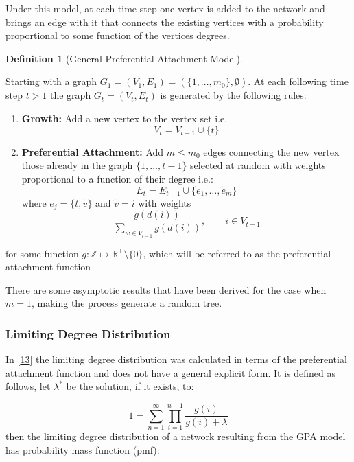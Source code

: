 \documentclass[
  10pt,
  a4paper,
]{scrreprt}
\providecommand{\tightlist}{%
  \setlength{\itemsep}{0pt}\setlength{\parskip}{0pt}}\usepackage{longtable,booktabs,array}
\theoremstyle{definition}
\newtheorem{definition}{Definition}[section]
\theoremstyle{plain}
\theoremstyle{plain}
\theoremstyle{remark}
\begin{document}
{Under this model, at each time step one vertex is added to the network
and brings an edge with it that connects the existing vertices with a
probability proportional to some function of the vertices degrees.

\begin{definition}[General Preferential Attachment
Model]\protect\hypertarget{def-gpa}{}\label{def-gpa}

Starting with a graph
\(G_1 = (V_1, E_1) = (\{1,\ldots,m_0\}, \emptyset)\). At each following
time step \(t>1\) the graph \(G_t = (V_t, E_t)\) is generated by the
following rules:

\begin{enumerate}
\def\labelenumi{\arabic{enumi}.}
\tightlist
\item
  \textbf{Growth:} Add a new vertex to the vertex set i.e.~\[
  V_t = V_{t-1} \cup \{t\}
  \]
\item
  \textbf{Preferential Attachment:} Add \(m\le m_0\) edges connecting
  the new vertex those already in the graph \(\{1,\ldots,t-1\}\)
  selected at random with weights proportional to a function of their
  degree i.e.: \[
  E_t  = E_{t-1} \cup \{\tilde e_1,\ldots,\tilde e_m\}
  \] where \(\tilde e_j = \{t,\tilde v\}\) and \(\tilde v = i\) with
  weights \[
  \displaystyle\frac{g(d(i))}{\sum_{w\in V_{t-1}} g(d(i))}, \qquad i\in V_{t-1}
  \]
\end{enumerate}

for some function \(g: \mathbb Z \mapsto \mathbb R^+\setminus\{0\}\),
which will be referred to as the preferential attachment function

\end{definition}

There are some asymptotic results that have been derived for the case
when \(m=1\), making the process generate a random tree.

\hypertarget{limiting-degree-distribution}{%
\subsubsection{Limiting Degree
Distribution}\label{limiting-degree-distribution}}

In {[}\protect\hyperlink{ref-rudas07}{13}{]} the limiting degree
distribution was calculated in terms of the preferential attachment
function and does not have a general explicit form. It is defined as
follows, let \(\lambda^*\) be the solution, if it exists, to:

\[
1=\sum_{n=1}^\infty \prod_{i=1}^{n-1}\displaystyle\frac{g(i)}{g(i)+\lambda}
\] then the limiting degree distribution of a network resulting from the
GPA model has probability mass function (pmf):

}
\end{document}
